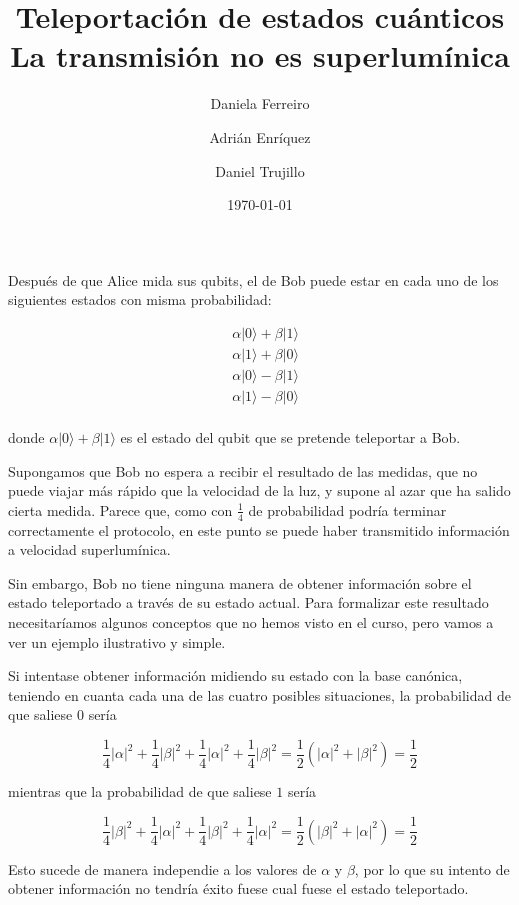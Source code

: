 \documentclass{article}
\title{%
	Teleportación de estados cuánticos \\ 
  \large La transmisión no es superlumínica
}
\author{
	Daniela Ferreiro \and 
	Adrián Enríquez \and 
	Daniel Trujillo
}
\date{\today}
\begin{document}
\maketitle

Después de que Alice mida sus qubits, el de Bob puede estar en cada
uno de los siguientes estados con misma probabilidad: 

\begin{align*}
  &\alpha|0\rangle + \beta|1\rangle \\ 
  &\alpha|1\rangle + \beta|0\rangle \\ 
  &\alpha|0\rangle - \beta|1\rangle \\ 
  &\alpha|1\rangle - \beta|0\rangle \\
\end{align*}

donde $\alpha|0\rangle + \beta|1\rangle$ es el estado del qubit que
se pretende teleportar a Bob.

Supongamos que Bob no espera a recibir el resultado de las medidas,
que no puede viajar más rápido que la velocidad de la luz, y supone
al azar que ha salido cierta medida. Parece que, como con
$\frac{1}{4}$ de probabilidad podría terminar correctamente el
protocolo, en este punto se puede haber transmitido información
a velocidad superlumínica.

Sin embargo, Bob no tiene ninguna manera de obtener información
sobre el estado teleportado a través de su estado actual. Para
formalizar este resultado necesitaríamos algunos conceptos que no
hemos visto en el curso, pero vamos a ver un ejemplo ilustrativo
y simple.

Si intentase obtener información midiendo su estado con la base
canónica, teniendo en cuanta cada una de las cuatro posibles
situaciones, la probabilidad de que saliese $0$ sería 

$$
\frac{1}{4}|\alpha|^2
  + \frac{1}{4}|\beta|^2
  + \frac{1}{4}|\alpha|^2
  + \frac{1}{4}|\beta|^2
= \frac{1}{2}(|\alpha|^2 + |\beta|^2)
= \frac{1}{2}
$$

mientras que la probabilidad de que saliese $1$ sería 

$$
\frac{1}{4}|\beta|^2
  + \frac{1}{4}|\alpha|^2
  + \frac{1}{4}|\beta|^2
  + \frac{1}{4}|\alpha|^2
= \frac{1}{2}(|\beta|^2 + |\alpha|^2)
= \frac{1}{2}
$$

Esto sucede de manera independie a los valores de $\alpha$
y $\beta$, por lo que su intento de obtener información no tendría
éxito fuese cual fuese el estado teleportado.
\end{document}
